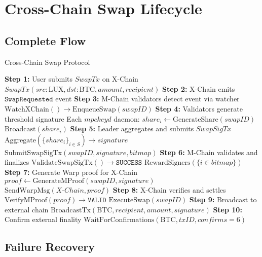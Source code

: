 \documentclass[11pt]{article}
\begin{document}
\section{Cross-Chain Swap Lifecycle}

\subsection{Complete Flow}

\begin{algorithm}[H]
\caption{Cross-Chain Swap Protocol}
\begin{algorithmic}[1]
\State \textbf{Step 1:} User submits $SwapTx$ on X-Chain
\State \quad $SwapTx(src: \text{LUX}, dst: \text{BTC}, amount, recipient)$
\State
\State \textbf{Step 2:} X-Chain emits $\texttt{SwapRequested}$ event
\State
\State \textbf{Step 3:} M-Chain validators detect event via watcher
\State \quad $\text{WatchXChain}() \rightarrow \text{EnqueueSwap}(swapID)$
\State
\State \textbf{Step 4:} Validators generate threshold signature
\State \quad Each $mpckeyd$ daemon:
\State \quad \quad $share_i \gets \text{GenerateShare}(swapID)$
\State \quad \quad $\text{Broadcast}(share_i)$
\State
\State \textbf{Step 5:} Leader aggregates and submits $SwapSigTx$
\State \quad $\text{Aggregate}(\{share_i\}_{i \in S}) \rightarrow signature$
\State \quad $\text{SubmitSwapSigTx}(swapID, signature, bitmap)$
\State
\State \textbf{Step 6:} M-Chain validates and finalizes
\State \quad $\text{ValidateSwapSigTx}() \rightarrow \texttt{SUCCESS}$
\State \quad $\text{RewardSigners}(\{i \in bitmap\})$
\State
\State \textbf{Step 7:} Generate Warp proof for X-Chain
\State \quad $proof \gets \text{GenerateMProof}(swapID, signature)$
\State \quad $\text{SendWarpMsg}(X\text{-}Chain, proof)$
\State
\State \textbf{Step 8:} X-Chain verifies and settles
\State \quad $\text{VerifyMProof}(proof) \rightarrow \texttt{VALID}$
\State \quad $\text{ExecuteSwap}(swapID)$ 
\State
\State \textbf{Step 9:} Broadcast to external chain
\State \quad $\text{BroadcastTx}(\text{BTC}, recipient, amount, signature)$
\State
\State \textbf{Step 10:} Confirm external finality
\State \quad $\text{WaitForConfirmations}(\text{BTC}, txID, confirms = 6)$
\end{algorithmic}
\end{algorithm}

\subsection{Failure Recovery}
\end{document}
